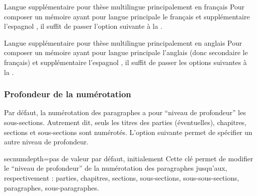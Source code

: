 \begin{dbexample}{Langue supplémentaire pour thèse
    multilingue principalement en français}{}
  Pour composer un mémoire ayant pour langue principale le français et
  supplémentaire l'espagnol , il suffit de passer l'option suivante à la \yatcl{}.
\end{dbexample}

\begin{dbexample}{Langue supplémentaire pour thèse
    multilingue principalement en anglais}{}
  Pour composer un mémoire ayant pour langue principale l'anglais (donc
  secondaire le français) et supplémentaire l'espagnol , il suffit de passer les options
  suivantes à la \yatcl{}.
\end{dbexample}

\subsubsection{Profondeur de la numérotation}\label{sec:profondeur-de-la}

Par défaut, la numérotation des paragraphes a pour \enquote{niveau de
  profondeur} les sous-sections. Autrement dit, seuls les titres des parties
(éventuelles), chapitres, sections et sous-sections sont numérotés.  L'option
 suivante permet de spécifier un autre niveau de
profondeur.
%
{%
  \begin{docKey}{secnumdepth}{=\textbar{}\textbar{}\textbar{}\textbar{}\textbar{}\textbar{}}{pas
      de valeur par défaut, initialement }
    Cette clé permet de modifier le \enquote{niveau de profondeur} de la
    numérotation des paragraphes jusqu'aux, respectivement : parties,
    chapitres, sections, sous-sections, sous-sous-sections, paragraphes,
    sous-paragraphes.
  \end{docKey}
}


